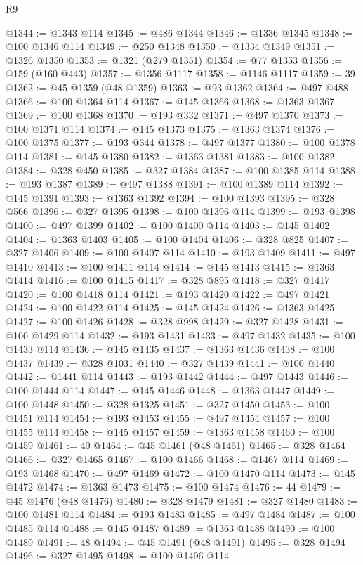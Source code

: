 \begin{lexlean}{R9}
\begin{coremodule}
{{{{{{{{{{{{{{{{{{{{{{{{{{{{{{{{{{{{{{{{{{{{{{{{{{{{{{{{{{{{{{{{{{{{{{{{{{{{{{{{{{{{{{{{{{{{{{{{{{{{{{{{{{{{@1344 := @1343 @114
@1345 := @486 @1344
@1346 := @1336 @1345
@1348 := @100 @1346 @114
@1349 := @250 @1348
@1350 := @1334 @1349
@1351 := @1326 @1350
@1353 := @1321 (@279 @1351)
@1354 := @77 @1353
@1356 := @159 (@160 @443)
@1357 := @1356 @1117
@1358 := @1146 @1117
@1359 := 39
@1362 := @45 @1359 (@48 @1359)
@1363 := @93 @1362
@1364 := @497 @488
@1366 := @100 @1364 @114
@1367 := @145 @1366
@1368 := @1363 @1367
@1369 := @100 @1368
@1370 := @193 @332
@1371 := @497 @1370
@1373 := @100 @1371 @114
@1374 := @145 @1373
@1375 := @1363 @1374
@1376 := @100 @1375
@1377 := @193 @344
@1378 := @497 @1377
@1380 := @100 @1378 @114
@1381 := @145 @1380
@1382 := @1363 @1381
@1383 := @100 @1382
@1384 := @328 @450
@1385 := @327 @1384
@1387 := @100 @1385 @114
@1388 := @193 @1387
@1389 := @497 @1388
@1391 := @100 @1389 @114
@1392 := @145 @1391
@1393 := @1363 @1392
@1394 := @100 @1393
@1395 := @328 @566
@1396 := @327 @1395
@1398 := @100 @1396 @114
@1399 := @193 @1398
@1400 := @497 @1399
@1402 := @100 @1400 @114
@1403 := @145 @1402
@1404 := @1363 @1403
@1405 := @100 @1404
@1406 := @328 @825
@1407 := @327 @1406
@1409 := @100 @1407 @114
@1410 := @193 @1409
@1411 := @497 @1410
@1413 := @100 @1411 @114
@1414 := @145 @1413
@1415 := @1363 @1414
@1416 := @100 @1415
@1417 := @328 @895
@1418 := @327 @1417
@1420 := @100 @1418 @114
@1421 := @193 @1420
@1422 := @497 @1421
@1424 := @100 @1422 @114
@1425 := @145 @1424
@1426 := @1363 @1425
@1427 := @100 @1426
@1428 := @328 @998
@1429 := @327 @1428
@1431 := @100 @1429 @114
@1432 := @193 @1431
@1433 := @497 @1432
@1435 := @100 @1433 @114
@1436 := @145 @1435
@1437 := @1363 @1436
@1438 := @100 @1437
@1439 := @328 @1031
@1440 := @327 @1439
@1441 := @100 @1440
@1442 := @1441 @114
@1443 := @193 @1442
@1444 := @497 @1443
@1446 := @100 @1444 @114
@1447 := @145 @1446
@1448 := @1363 @1447
@1449 := @100 @1448
@1450 := @328 @1325
@1451 := @327 @1450
@1453 := @100 @1451 @114
@1454 := @193 @1453
@1455 := @497 @1454
@1457 := @100 @1455 @114
@1458 := @145 @1457
@1459 := @1363 @1458
@1460 := @100 @1459
@1461 := 40
@1464 := @45 @1461 (@48 @1461)
@1465 := @328 @1464
@1466 := @327 @1465
@1467 := @100 @1466
@1468 := @1467 @114
@1469 := @193 @1468
@1470 := @497 @1469
@1472 := @100 @1470 @114
@1473 := @145 @1472
@1474 := @1363 @1473
@1475 := @100 @1474
@1476 := 44
@1479 := @45 @1476 (@48 @1476)
@1480 := @328 @1479
@1481 := @327 @1480
@1483 := @100 @1481 @114
@1484 := @193 @1483
@1485 := @497 @1484
@1487 := @100 @1485 @114
@1488 := @145 @1487
@1489 := @1363 @1488
@1490 := @100 @1489
@1491 := 48
@1494 := @45 @1491 (@48 @1491)
@1495 := @328 @1494
@1496 := @327 @1495
@1498 := @100 @1496 @114
}}}}}}}}}}}}}}}}}}}}}}}}}}}}}}}}}}}}}}}}}}}}}}}}}}}}}}}}}}}}}}}}}}}}}}}}}}}}}}}}}}}}}}}}}}}}}}}}}}}}}}}}}}}}
\end{coremodule}
\end{lexlean}

